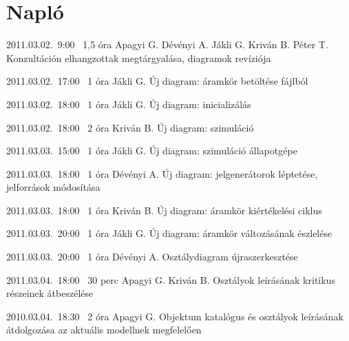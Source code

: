 %
\section{Napló}

\begin{naplo}

\bejegyzes
{2011.03.02.~9:00~} %
{1,5 óra} %
{Apagyi G.\newline
Dévényi A.\newline
Jákli G.\newline
Kriván B.\newline
Péter T.} %
{Konzultáción elhangzottak megtárgyalása, diagramok revíziója} %

\bejegyzes
{2011.03.02.~17:00~} %
{1 óra} %
{Jákli G.} %
{Új diagram: áramkör betöltése fájlból} %

\bejegyzes
{2011.03.02.~18:00~} %
{1 óra} %
{Jákli G.} %
{Új diagram: inicializálás} %

\bejegyzes
{2011.03.02.~18:00~} %
{2 óra} %
{Kriván B.} %
{Új diagram: szimuláció} %

\bejegyzes
{2011.03.03.~15:00~} %
{1 óra} %
{Jákli G.} %
{Új diagram: szimuláció állapotgépe} %

\bejegyzes
{2011.03.03.~18:00~} %
{1 óra} %
{Dévényi A.} %
{Új diagram: jelgenerátorok léptetése, jelforrások módosítása} %

\bejegyzes
{2011.03.03.~18:00~} %
{1 óra} %
{Kriván B.} %
{Új diagram: áramkör kiértékelési ciklus} %

\bejegyzes
{2011.03.03.~20:00~} %
{1 óra} %
{Jákli G.} %
{Új diagram: áramkör változásának észlelése} %

\bejegyzes
{2011.03.03.~20:00~} %
{1 óra} %
{Dévényi A.} %
{Osztálydiagram újraszerkesztése} %

\bejegyzes
{2011.03.04.~18:00~} %
{30 perc} %
{Apagyi G.\newline
Kriván B.} %
{Osztályok leírásának kritikus részeinek átbeszélése} %

\bejegyzes
{2010.03.04.~18:30~}
{2 óra}
{Apagyi G.}
{Objektum katalógus és osztályok leírásának átdolgozása az aktuális modellnek megfelelően}


\end{naplo}
